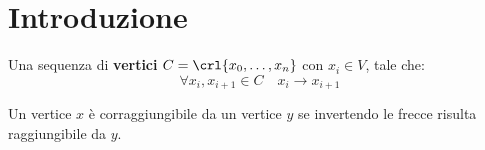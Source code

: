 \documentclass[\main/main.tex]{subfiles}
\begin{document}
\chapter{Introduzione}
\begin{definition}
  Una sequenza di \textbf{vertici} \(C = \crl{x_0, \ldots, x_n}\) con \(x_i \in V\), tale che:
  \[
    \forall x_i, x_{i+1} \in C \quad x_i \rightarrow x_{i+1}
  \]
\end{definition}
\begin{definition}
  Un vertice \(x\) è corraggiungibile da un vertice \(y\) se invertendo le frecce risulta raggiungibile da \(y\).
\end{definition}
\end{document}
